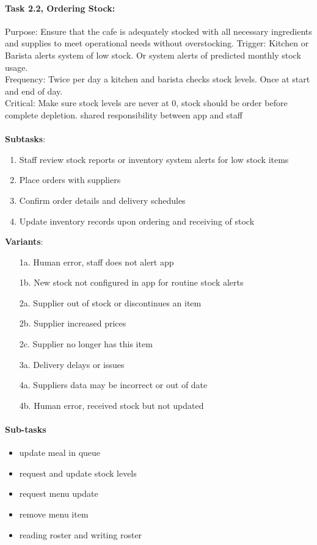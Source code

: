 \documentclass{article}
\begin{document}
\paragraph{Task 2.2, Ordering Stock:}
Purpose: Ensure that the cafe is adequately stocked with all necessary ingredients and supplies to meet operational needs without overstocking.
Trigger: Kitchen or Barista alerts system of low stock. Or system alerts of predicted monthly stock usage.\\
Frequency: Twice per day a kitchen and barista checks stock levels. Once at start and end of day.\\
Critical: Make sure stock levels are never at 0, stock should be order before complete depletion. shared responsibility between app and staff\\
\\
\textbf{Subtasks}:
\begin{enumerate}
    \item Staff review stock reports or inventory system alerts for low stock items
    \item Place orders with suppliers
    \item Confirm order details and delivery schedules
    \item Update inventory records upon ordering and receiving of stock
\end{enumerate}
\textbf{Variants}:
\begin{enumerate}
    \item [1a.] Human error, staff does not alert app
    \item [1b.] New stock not configured in app for routine stock alerts
    \item [2a.] Supplier out of stock or discontinues an item
    \item [2b.] Supplier increased prices
    \item [2c.] Supplier no longer has this item
    \item [3a.] Delivery delays or issues
    \item [4a.] Suppliers data may be incorrect or out of date
    \item [4b.] Human error, received stock but not updated
\end{enumerate}


\paragraph{Sub-tasks}
\begin{itemize}
    \item update meal in queue
    \item request and update stock levels
    \item request menu update
    \item remove menu item
    \item reading roster and writing roster
\end{itemize}
\end{document}
